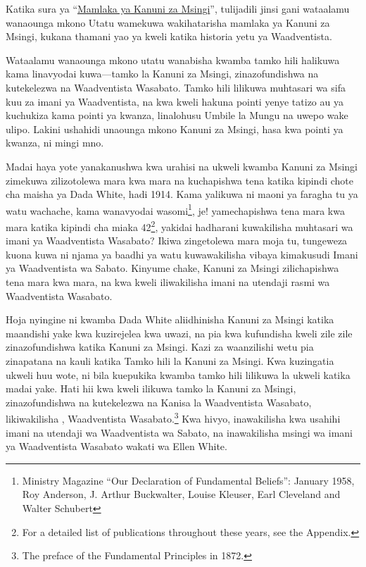 Katika sura ya “\hyperref[chap:authority]{Mamlaka ya Kanuni za Msingi}”, tulijadili jinsi gani wataalamu wanaounga mkono Utatu wamekuwa wakihatarisha mamlaka ya Kanuni za Msingi, kukana thamani yao ya kweli katika historia yetu ya Waadventista.

Wataalamu wanaounga mkono utatu wanabisha kwamba tamko hili halikuwa kama linavyodai kuwa—tamko la Kanuni za Msingi, zinazofundishwa na kutekelezwa na Waadventista Wasabato. Tamko hili lilikuwa muhtasari wa sifa kuu za imani ya Waadventista, na kwa kweli hakuna pointi yenye tatizo au ya kuchukiza kama pointi ya kwanza, linalohusu Umbile la Mungu na uwepo wake ulipo. Lakini ushahidi unaounga mkono Kanuni za Msingi, hasa kwa pointi ya kwanza, ni mingi mno.

Madai haya yote yanakanushwa kwa urahisi na ukweli kwamba Kanuni za Msingi zimekuwa zilizotolewa mara kwa mara na kuchapishwa tena katika kipindi chote cha maisha ya Dada White, hadi 1914. Kama yalikuwa ni maoni ya faragha tu ya watu wachache, kama wanavyodai wasomi\footnote{Ministry Magazine “Our Declaration of Fundamental Beliefs”: January 1958, Roy Anderson, J. Arthur Buckwalter, Louise Kleuser, Earl Cleveland and Walter Schubert}, je! yamechapishwa tena mara kwa mara katika kipindi cha miaka 42\footnote{For a detailed list of publications throughout these years, see the Appendix.}, yakidai hadharani kuwakilisha muhtasari wa imani ya Waadventista Wasabato? Ikiwa zingetolewa mara moja tu, tungeweza kuona kuwa ni njama ya baadhi ya watu kuwawakilisha vibaya kimakusudi Imani ya Waadventista wa Sabato. Kinyume chake, Kanuni za Msingi zilichapishwa tena mara kwa mara, na kwa kweli iliwakilisha imani na utendaji rasmi wa Waadventista Wasabato.

Hoja nyingine ni kwamba Dada White aliidhinisha Kanuni za Msingi katika maandishi yake kwa kuzirejelea kwa uwazi, na pia kwa kufundisha kweli zile zile zinazofundishwa katika Kanuni za Msingi. Kazi za waanzilishi wetu pia zinapatana na kauli katika Tamko hili la Kanuni za Msingi. Kwa kuzingatia ukweli huu wote, ni bila kuepukika kwamba tamko hili lilikuwa la ukweli katika madai yake. Hati hii kwa kweli ilikuwa tamko la Kanuni za Msingi, zinazofundishwa na kutekelezwa na Kanisa la Waadventista Wasabato, likiwakilisha ,  Waadventista Wasabato.\footnote{The preface of the Fundamental Principles in 1872.} Kwa hivyo, inawakilisha kwa usahihi imani na utendaji wa Waadventista wa Sabato, na inawakilisha msingi wa imani ya Waadventista Wasabato wakati wa Ellen White.

